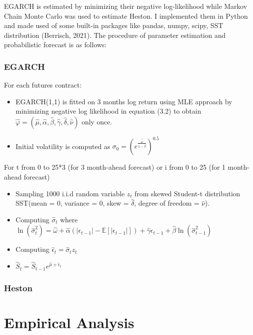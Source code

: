 \documentclass[12pt,a4paper]{article}
\numberwithin{equation}{section}
\begin{document}
EGARCH is estimated by minimizing their negative log-likelihood while Markov Chain Monte Carlo was used to estimate Heston. I implemented them in Python and made used of some built-in packages like pandas, numpy, scipy, SST distribution (Berrisch, 2021). The procedure of parameter estimation and probabilistic forecast is as follows:

\subsubsection{EGARCH}

For each futures contract:

\begin{itemize}
\item EGARCH(1,1) is fitted on 3 months log return using MLE approach by minimizing negative log likelihood in equation (3.2) to obtain $ \hat{\varphi} = (\hat{\mu}, \hat{\alpha}, \hat{\beta}, \hat{\gamma}, \hat{\delta}, \hat{\nu})$ only once.
\item Initial volatility is computed as $\sigma_0 = (e^{\frac{\hat{\omega}}{1-\hat{\beta}}})^{0.5}$
\end{itemize}

For t from 0 to 25*3 (for 3 month-ahead forecast) or i from 0 to 25 (for 1 month-ahead forecast)
\begin{itemize}
\item Sampling 1000 i.i.d random variable $z_t$ from skewed Student-t distribution SST(mean = 0, variance = 0, skew = $\hat{\delta}$, degree of freedom = $\hat{\nu}$).
\item Computing $\hat{\sigma}_t$ where $ \ln\left(\hat{\sigma}_t^2\right) = \hat{\omega} + \hat{\alpha} \left( |\epsilon_{t-1}| - \mathbb{E}[|\epsilon_{t-1}|] \right) + \hat{\gamma} \epsilon_{t-1} +  \hat{\beta} \ln\left(\hat{\sigma}_{t-1}^2\right)$
\item Computing $\hat{\epsilon}_t = \hat{\sigma}_t z_t $
\item $\hat{S}_t = \hat{S}_{t-1} e^{\hat{\mu} + \hat{\epsilon}_t}$
\end{itemize}

\subsubsection{Heston}


\section{Empirical Analysis}
\end{document}
